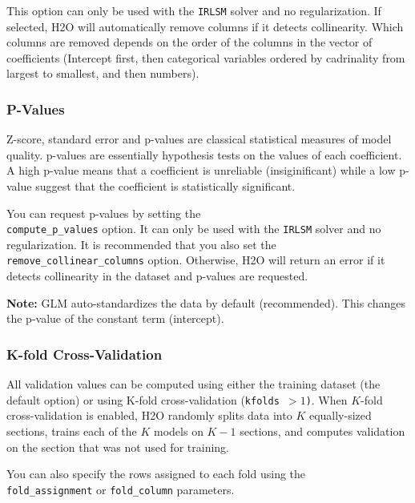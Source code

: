 This option can only be used with the \texttt{IRLSM} solver and no regularization. If selected, H2O will automatically
remove columns if it detects collinearity. Which columns are removed depends on the order of the columns in the vector
of coefficients (Intercept first, then categorical variables ordered by cadrinality from largest to smallest, and then
numbers).

\waterExampleInR



\subsubsection{P-Values}
Z-score, standard error and p-values are classical statistical measures of model quality. p-values are essentially
hypothesis tests on the values of each coefficient. A high p-value means that a coefficient is unreliable
(insiginificant) while a low p-value suggest that the coefficient is statistically significant.

You can request p-values by setting the \\\texttt{compute\_p\_values} option. It can only be used with the
\texttt{IRLSM} solver and no regularization. It is recommended that you also set the
\texttt{remove\_collinear\_columns} option. Otherwise, H2O will return an error if it detects collinearity in the dataset and p-values are requested. 

\textbf{Note:} GLM auto-standardizes the data by default (recommended). This changes the p-value of the constant term
(intercept).

\waterExampleInR



\subsubsection{K-fold Cross-Validation}

All validation values can be computed using either the training dataset (the default option) or using K-fold
cross-validation (\texttt{kfolds $> 1$)}. When $K$-fold cross-validation is enabled, H2O randomly splits data into $K$
equally-sized sections, trains each of the $K$ models on $K-1$ sections, and computes validation on the section that was not
used for training.

You can also specify the rows assigned to each fold using the\\ \texttt{fold\_assignment}
or \texttt{fold\_column} parameters.

